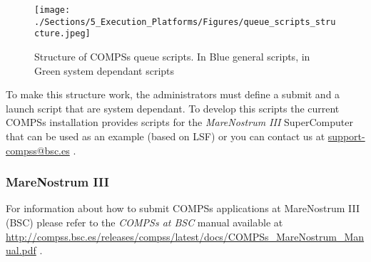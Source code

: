 \begin{figure}[h!]
  \centering
    \texttt{[image: ./Sections/5\_Execution\_Platforms/Figures/queue\_scripts\_structure.jpeg]}
    \caption{Structure of COMPSs queue scripts. In Blue general scripts, in Green system dependant scripts}
    \label{fig:queue_scripts_structure}
\end{figure}

To make this structure work, the administrators must define a submit and a launch script that are system dependant. To develop this
scripts the current COMPSs installation provides scripts for the \textit{MareNostrum III} SuperComputer that can be used as an 
example (based on LSF) or you can contact us at \url{support-compss@bsc.es} .

\subsubsection{MareNostrum III}

For information about how to submit COMPSs applications at MareNostrum III (BSC) please refer to the \textit{COMPSs at BSC} manual 
available at \url{http://compss.bsc.es/releases/compss/latest/docs/COMPSs_MareNostrum_Manual.pdf} .
